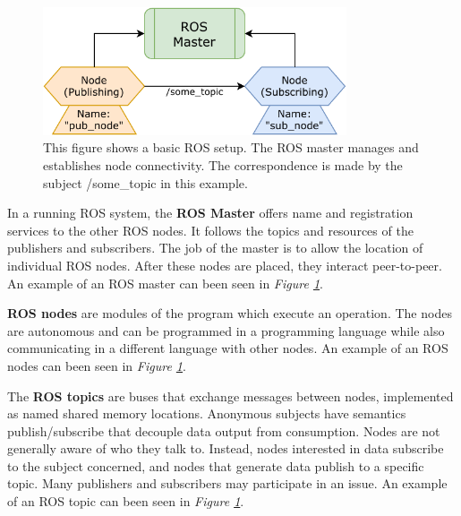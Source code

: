 \begin{figure}[h]%
    \centering
    \includegraphics[width=0.8\textwidth]{graphics/rosmaster.pdf}
    \caption{This figure shows a basic ROS setup. The ROS master manages and establishes node connectivity. The correspondence is made by the subject /some\_topic in this example.}
    \label{fig:rosmaster}
\end{figure}

In a running ROS system, the \textbf{ROS Master} offers name and registration services to the other ROS nodes. It follows the topics and resources of the publishers and subscribers. The job of the master is to allow the location of individual ROS nodes. After these nodes are placed, they interact peer-to-peer\cite{noauthor_master_nodate}. An example of an ROS master can been seen in \textit{Figure \ref{fig:rosmaster}}.


\textbf{ROS nodes} are modules of the program which execute an operation. 
The nodes are autonomous and can be programmed in a programming language while also communicating in a different language with other nodes\cite{noauthor_rostutorialsunderstandingnodes_nodate}. An example of an ROS nodes can been seen in \textit{Figure \ref{fig:rosmaster}}.


The \textbf{ROS topics} are buses that exchange messages between nodes, implemented as named shared memory locations. Anonymous subjects have semantics publish/subscribe that decouple data output from consumption. Nodes are not generally aware of who they talk to. Instead, nodes interested in data subscribe to the subject concerned, and nodes that generate data publish to a specific topic. Many publishers and subscribers may participate in an issue\cite{noauthor_topics_nodate}. An example of an ROS topic can been seen in \textit{Figure \ref{fig:rosmaster}}.

